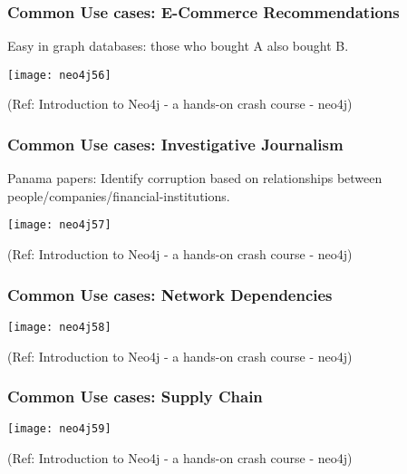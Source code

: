 \begin{frame}\frametitle{Common Use cases: E-Commerce Recommendations}


Easy in graph databases: those who bought A also bought B.

\begin{center}
\texttt{[image: neo4j56]}
\end{center}	

{\tiny (Ref: Introduction to Neo4j - a hands-on crash course - neo4j)}
\end{frame}

\begin{frame}\frametitle{Common Use cases: Investigative Journalism}

Panama papers: Identify corruption based on relationships between people/companies/financial-institutions.

\begin{center}
\texttt{[image: neo4j57]}
\end{center}	

{\tiny (Ref: Introduction to Neo4j - a hands-on crash course - neo4j)}
\end{frame}

\begin{frame}\frametitle{Common Use cases: Network Dependencies}



\begin{center}
\texttt{[image: neo4j58]}
\end{center}	

{\tiny (Ref: Introduction to Neo4j - a hands-on crash course - neo4j)}
\end{frame}


\begin{frame}\frametitle{Common Use cases: Supply Chain}



\begin{center}
\texttt{[image: neo4j59]}
\end{center}	

{\tiny (Ref: Introduction to Neo4j - a hands-on crash course - neo4j)}
\end{frame}

